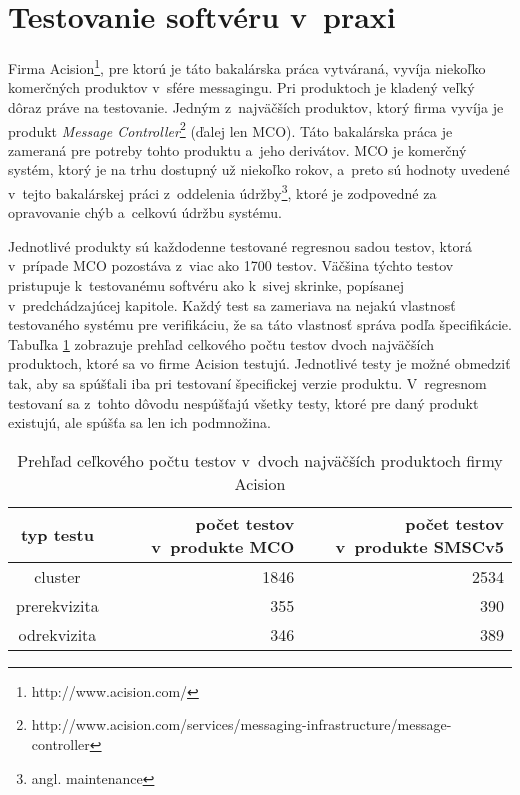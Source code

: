 \section{Testovanie softvéru v~praxi} 
\label{sekcia:testovanie_v_praxi}
Firma Acision\footnote{http://www.acision.com/}, pre ktorú je táto 
bakalárska práca vytváraná, vyvíja niekoľko komerčných produktov
v~sfére messagingu. 
Pri produktoch je kladený veľký dôraz práve na testovanie.
Jedným z~najväčších produktov, ktorý firma vyvíja je produkt 
\textit{Message Controller}\footnote{http://www.acision.com/services/messaging-infrastructure/message-controller}
(ďalej len MCO).
Táto bakalárska práca je zameraná pre potreby tohto produktu a~jeho 
derivátov. MCO je komerčný systém, ktorý je na trhu dostupný už niekoľko 
rokov, a~preto sú hodnoty uvedené v~tejto bakalárskej práci z~oddelenia 
údržby\footnote{angl. maintenance}, ktoré je zodpovedné za opravovanie 
chýb a~celkovú údržbu systému.

Jednotlivé produkty sú každodenne testované regresnou 
sadou testov, ktorá v~prípade MCO pozostáva z~viac ako 1700 testov.
Väčšina týchto testov pristupuje k~testovanému softvéru ako k~sivej 
skrinke, popísanej v~predchádzajúcej kapitole.
Každý test sa zameriava na nejakú vlastnosť testovaného systému pre 
verifikáciu, že sa táto vlastnosť správa podľa špecifikácie.
Tabuľka \ref{tabulka:pocet_testov} zobrazuje prehľad celkového počtu 
testov dvoch najväčších produktoch, ktoré sa vo firme Acision testujú.
Jednotlivé testy je možné obmedziť tak, aby sa spúšťali iba pri testovaní
špecifickej verzie produktu. 
V~regresnom testovaní sa z~tohto dôvodu nespúšťajú všetky testy, 
ktoré pre daný produkt existujú, ale spúšťa sa len ich podmnožina.

\begin{table}
  \begin{center}
    \begin{tabular}{| c | r | r |}
    \hline
    typ testu & počet testov v~produkte MCO & počet testov v~produkte SMSCv5 \\ \hline
    cluster & 1846 & 2534 \\ \hline
    prerekvizita & 355 & 390 \\ \hline
    odrekvizita & 346 & 389 \\
    \hline
    \end{tabular}
    \caption{Prehľad ceľkového počtu testov v~dvoch najväčších 
             produktoch firmy Acision}
    \label{tabulka:pocet_testov}
  \end{center}
\end{table}

